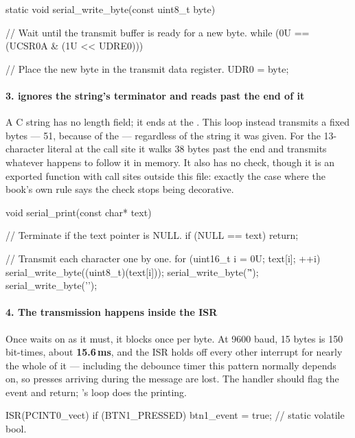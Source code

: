 \begin{ccode}
static void serial_write_byte(const uint8_t byte)
{
    // Wait until the transmit buffer is ready for a new byte.
    while (0U == (UCSR0A & (1U << UDRE0))) {}

    // Place the new byte in the transmit data register.
    UDR0 = byte;
}
\end{ccode}

\paragraph{3.  ignores the string's terminator and reads past the end of it}
A C string has no length field; it ends at the . This loop instead transmits a fixed
 bytes --- 51, because of the \code{<=} --- regardless of the string it was given.
For the 13-character literal at the call site it walks 38 bytes past the end and transmits whatever
happens to follow it in memory. It also has no  check, though it is an exported function
with call sites outside this file: exactly the case where the book's own rule says the check stops
being decorative.

\begin{ccode}
void serial_print(const char* text)
{
    // Terminate if the text pointer is NULL.
    if (NULL == text) { return; }

    // Transmit each character one by one.
    for (uint16_t i = 0U; text[i]; ++i)
    {
        serial_write_byte((uint8_t)(text[i]));
    }
    serial_write_byte('\r');
    serial_write_byte('\n');
}
\end{ccode}

\paragraph{4. The transmission happens inside the ISR}
Once  waits on  as it must, it blocks once per byte. At 9600
baud, 15 bytes is 150 bit-times, about \textbf{15.6\,ms}, and the ISR holds off every other
interrupt for nearly the whole of it --- including the debounce timer this pattern normally depends
on, so presses arriving during the message are lost. The handler should flag the event and return;
's loop does the printing.

\begin{ccode}
ISR(PCINT0_vect)
{
    if (BTN1_PRESSED) { btn1_event = true; }   // static volatile bool.
}
\end{ccode}

